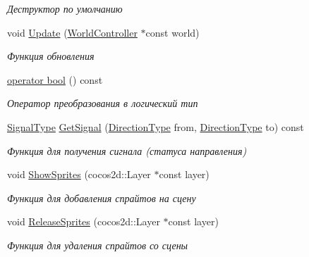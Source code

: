 \begin{DoxyCompactItemize}
\begin{DoxyCompactList}\small\item\em Деструктор по умолчанию \end{DoxyCompactList}\item 
void \hyperlink{classrtm_1_1_control_unit_afb3eba6577d912109784ac1d32338859}{Update} (\hyperlink{classrtm_1_1_world_controller}{World\+Controller} $\ast$const world)
\begin{DoxyCompactList}\small\item\em Функция обновления \end{DoxyCompactList}\item 
\hyperlink{classrtm_1_1_control_unit_ab48f3a045d62fa1f251af2ece4b52d44}{operator bool} () const
\begin{DoxyCompactList}\small\item\em Оператор преобразования в логический тип \end{DoxyCompactList}\item 
\hyperlink{namespacertm_aadb7300c15d57429546fb0b7f8ee0ee6}{Signal\+Type} \hyperlink{classrtm_1_1_control_unit_afa3dcc399f2f5b7d0c1451aa65977da6}{Get\+Signal} (\hyperlink{namespacertm_a57b216f3aeb45041f3461bab08bc3aeb}{Direction\+Type} from, \hyperlink{namespacertm_a57b216f3aeb45041f3461bab08bc3aeb}{Direction\+Type} to) const
\begin{DoxyCompactList}\small\item\em Функция для получения сигнала (статуса направления) \end{DoxyCompactList}\item 
void \hyperlink{classrtm_1_1_control_unit_af126b136af6883970ded2a592c90d2b1}{Show\+Sprites} (cocos2d\+::\+Layer $\ast$const layer)
\begin{DoxyCompactList}\small\item\em Функция для добавления спрайтов на сцену \end{DoxyCompactList}\item 
void \hyperlink{classrtm_1_1_control_unit_ac21d7c91d9c62fb58f29b2412ce4d4be}{Release\+Sprites} (cocos2d\+::\+Layer $\ast$const layer)
\begin{DoxyCompactList}\small\item\em Функция для удаления спрайтов со сцены \end{DoxyCompactList}\end{DoxyCompactItemize}

